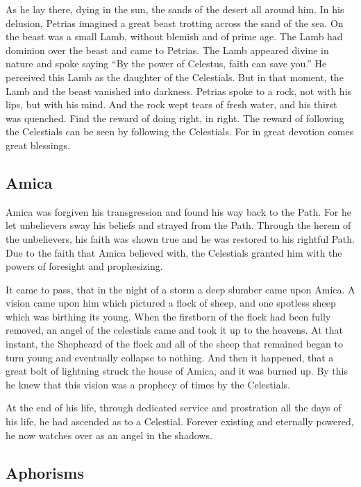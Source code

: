 As he lay there, dying in the sun, the sands of the desert all around him. In his delusion, Petrias imagined a great beast trotting across the sand of the sea. On the beast was a small Lamb, without blemish and of prime age. The Lamb had dominion over the beast and came to Petrias. The Lamb appeared divine in nature and spoke saying “By the power of Celestus, faith can save you.” He perceived this Lamb as the daughter of the Celestials. But in that moment, the Lamb and the beast vanished into darkness. Petrias spoke to a rock, not with his lips, but with his mind. And the rock wept tears of fresh water, and his thirst was quenched. Find the reward of doing right, in right. The reward of following the Celestials can be seen by following the Celestials. For in great devotion comes great blessings.

\subsection{Amica}

Amica was forgiven his transgression and found his way back to the Path. For he let unbelievers sway his beliefs and strayed from the Path. Through the herem of the unbelievers, his faith was shown true and he was restored to his rightful Path. Due to the faith that Amica believed with, the Celestials granted him with the powers of foresight and prophesizing.

It came to pass, that in the night of a storm a deep slumber came upon Amica. A vision came upon him which pictured a flock of sheep, and one spotless sheep which was birthing its young. When the firstborn of the flock had been fully removed, an angel of the celestials came and took it up to the heavens. At that instant, the Shepheard of the flock and all of the sheep that remained began to turn young and eventually collapse to nothing. And then it happened, that a great bolt of lightning struck the house of Amica, and it was burned up. By this he knew that this vision was a prophecy of times by the Celestials.
   
At the end of his life, through dedicated service and prostration all the days of his life, he had ascended as to a Celestial. Forever existing and eternally powered, he now watches over as an angel in the shadows.

\subsection{Aphorisms}

